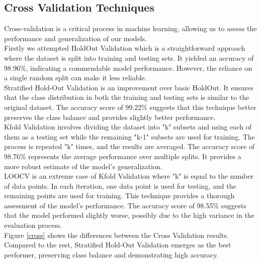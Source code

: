 \documentclass{article}
\begin{document}
\begin{multicols}{2}


\subsection{Cross Validation Techniques}

\hspace*{\parindent}Cross-validation is a critical process in machine learning, allowing us to assess the performance and generalization of our models.\\
\hspace*{\parindent}
Firstly we attempted HoldOut Validation which is a straightforward approach where the dataset is split into training and testing sets. It yielded an accuracy of 98.96\%, indicating a commendable model performance. However, the reliance on a single random split can make it less reliable.\\
\hspace*{\parindent}
 Stratified Hold-Out Validation is an improvement over basic HoldOut. It ensures that the class distribution in both the training and testing sets is similar to the original dataset. The accuracy score of 99.22\% suggests that this technique better preserves the class balance and provides slightly better performance.\\
\hspace*{\parindent}
 Kfold Validation involves dividing the dataset into "k" subsets and using each of them as a testing set while the remaining "k-1" subsets are used for training. The process is repeated "k" times, and the results are averaged. The accuracy score of 98.76\% represents the average performance over multiple splits. It provides a more robust estimate of the model's generalization.\\
 \hspace*{\parindent}
 LOOCV is an extreme case of Kfold Validation where "k" is equal to the number of data points. In each iteration, one data point is used for testing, and the remaining points are used for training. This technique provides a thorough assessment of the model's performance. The accuracy score of 98.55\% suggests that the model performed slightly worse, possibly due to the high variance in the evaluation process.\\
 \hspace*{\parindent}
 Figure \ref{cross} shows the differences between the Cross Validation results. Compared to the rest, Stratified Hold-Out Validation emerges as the best performer, preserving class balance and demonstrating high accuracy.\\
 \hspace*{\parindent}\\

\end{multicols}
\end{document}
